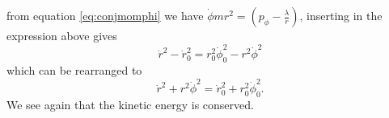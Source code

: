 \documentclass[11pt]{amsart}
\begin{document}
from equation \ref{eq:conjmomphi} we have $\dot{\phi}mr^2 = \left(p_\phi-\frac{\lambda}{r}\right)$, inserting in the expression above gives
\begin{equation*}
\dot{r}^2 - \dot{r}_0^2 = r_0^2\dot{\phi}_0^2 - r^2\dot{\phi}^2
\end{equation*}
which can be rearranged to
\begin{equation}
\dot{r}^2 + r^2\dot{\phi}^2 = \dot{r}_0^2 + r_0^2\dot{\phi}_0^2.
\end{equation}
We see again that the kinetic energy is conserved.
\end{document}
